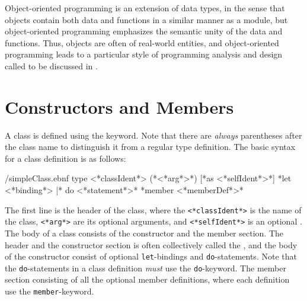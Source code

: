 Object-oriented programming is an extension of data types, in the sense that objects contain both data and functions in a similar manner as a module, but object-oriented programming emphasizes the semantic unity of the data and functions. Thus, objects are often  of real-world entities, and object-oriented programming leads to a particular style of programming analysis and design called  to be discussed in . 

\section{Constructors and Members}
\label{sec:constructor}
A class is defined using the  keyword. Note that there are \emph{always} parentheses after the class name to distinguish it from a regular type definition. The basic syntax for a class definition is as follows:%
%
\begin{verbatimwrite}{\ebnf/simpleClass.ebnf}
type <*classIdent*> ({*<*arg*>*}) [*as <*selfIdent*>*] 
  {*let <*binding*> |* do <*statement*>*}
  {*member <*memberDef*>*}
\end{verbatimwrite}
%
The first line is the header of the class, where the \lstinline[language=syntax]{<*classIdent*>} is the name of the class, \lstinline[language=syntax]{<*arg*>} are its optional arguments, and \lstinline[language=syntax]{<*selfIdent*>} is an optional . The body of a class consists of the constructor and the member section. The header and the constructor section is often collectively called the , and the body of the constructor consist of optional \lstinline{let}-bindings and \lstinline{do}-statements. Note that the \lstinline{do}-statements in a class definition \emph{must} use the \lstinline{do}-keyword. The member section consisting of all the optional member definitions, where each definition use the \lstinline{member}-keyword.


